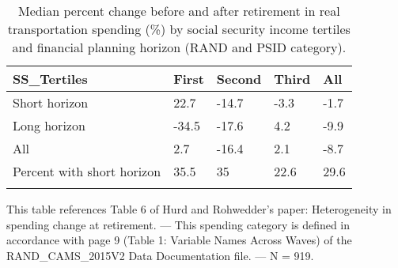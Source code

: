 \begin{table}[tbp] \centering
{}

\caption{Median percent change before and after retirement in real transportation spending (\%) by social security income tertiles and financial planning horizon (RAND and PSID category).}
\begin{tabularx}{\textwidth}{lCCCC}

\toprule
{SS\_Tertiles}&{First}&{Second}&{Third}&{All} \tabularnewline
\midrule\addlinespace[1.5ex]
Short horizon&22.7&-14.7&-3.3&-1.7 \tabularnewline
Long horizon&-34.5&-17.6&4.2&-9.9 \tabularnewline
All&2.7&-16.4&2.1&-8.7 \tabularnewline
Percent with short horizon&35.5&35&22.6&29.6 \tabularnewline
\bottomrule \addlinespace[1.5ex]

\end{tabularx}
\begin{flushleft}
\footnotesize This table references Table 6 of Hurd and Rohwedder's paper: Heterogeneity in spending change at retirement. \linebreak --- \linebreak This spending category is defined in accordance with page 9 (Table 1: Variable Names Across Waves) of the RAND\_CAMS\_2015V2 Data Documentation file. \linebreak --- \linebreak N = 919.
\end{flushleft}
\end{table}
